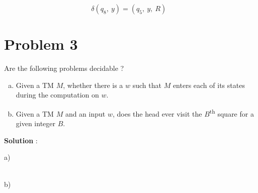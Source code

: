 \documentclass{article}
\begin{document}
    $~~~~~~~~~~~~~~~~~~~~~~~~~~~~~~~~~~~~~~~~~~~~~~~~~~~~~~~~\delta(q_8,~y)=(q_5,~y,~R)$
    
    
    \section*{Problem 3} Are the following problems decidable ?
    
    \begin{enumerate}[(a)]
        \item Given a TM $M$, whether there is a $w$ such that $M$ enters each of its states during the computation on $w$.
        \item Given a TM $M$ and an input $w$, does the head ever visit the $B$\textsuperscript{th} square for a given integer $B$.
    \end{enumerate}
    
    \textbf{Solution} :
    
    a)
    
    \\
    b)
    
\end{document}
